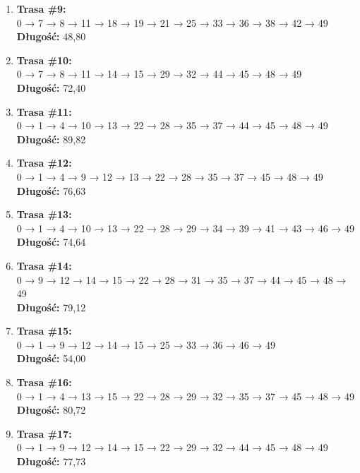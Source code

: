\documentclass{article}
\begin{document}
\begin{enumerate}
    \item \textbf{Trasa \#9:}\\
    0 → 7 → 8 → 11 → 18 → 19 → 21 → 25 → 33 → 36 → 38 → 42 → 49\\
    \textbf{Długość:} 48{,}80

    \item \textbf{Trasa \#10:}\\
    0 → 7 → 8 → 11 → 14 → 15 → 29 → 32 → 44 → 45 → 48 → 49\\
    \textbf{Długość:} 72{,}40

    \item \textbf{Trasa \#11:}\\
    0 → 1 → 4 → 10 → 13 → 22 → 28 → 35 → 37 → 44 → 45 → 48 → 49\\
    \textbf{Długość:} 89{,}82

    \item \textbf{Trasa \#12:}\\
    0 → 1 → 4 → 9 → 12 → 13 → 22 → 28 → 35 → 37 → 45 → 48 → 49\\
    \textbf{Długość:} 76{,}63

    \item \textbf{Trasa \#13:}\\
    0 → 1 → 4 → 10 → 13 → 22 → 28 → 29 → 34 → 39 → 41 → 43 → 46 → 49\\
    \textbf{Długość:} 74{,}64

    \item \textbf{Trasa \#14:}\\
    0 → 9 → 12 → 14 → 15 → 22 → 28 → 31 → 35 → 37 → 44 → 45 → 48 → 49\\
    \textbf{Długość:} 79{,}12

    \item \textbf{Trasa \#15:}\\
    0 → 1 → 9 → 12 → 14 → 15 → 25 → 33 → 36 → 46 → 49\\
    \textbf{Długość:} 54{,}00

    \item \textbf{Trasa \#16:}\\
    0 → 1 → 4 → 13 → 15 → 22 → 28 → 29 → 32 → 35 → 37 → 45 → 48 → 49\\
    \textbf{Długość:} 80{,}72

    \item \textbf{Trasa \#17:}\\
    0 → 1 → 9 → 12 → 14 → 15 → 22 → 29 → 32 → 44 → 45 → 48 → 49\\
    \textbf{Długość:} 77{,}73


\end{enumerate}
\end{document}
